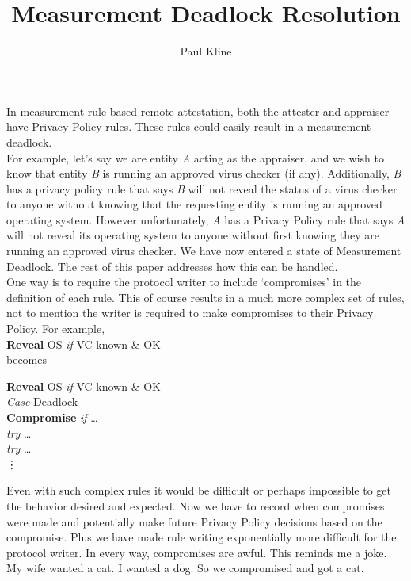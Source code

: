 \documentclass[10pt,a4paper,tikz]{article}
\author{Paul Kline}
\begin{document}
\title{Measurement Deadlock Resolution}

\maketitle

In measurement rule based remote attestation, both the attester and appraiser have Privacy Policy rules. These rules could easily result in a measurement deadlock. \\

For example, let's say we are entity \textit{A} acting as the appraiser, and we wish to know that entity \textit{B} is running an approved virus checker (if any). Additionally, \textit{B} has a privacy policy rule that says \textit{B} will not reveal the status of a virus checker to anyone without knowing that the requesting entity is running an approved operating system. However unfortunately, \textit{A} has a Privacy Policy rule that says \textit{A} will not reveal its operating system to anyone without first knowing they are running an approved virus checker. We have now entered a state of Measurement Deadlock. The rest of this paper addresses how this can be handled. \\

One way is to require the protocol writer to include `compromises' in the definition of each rule. This of course results  in a much more complex set of rules, not to mention the writer is required to make compromises to their Privacy Policy. For example, \\

\textbf{Reveal} OS \textit{if} VC known \& OK \\
becomes 

\textbf{Reveal} OS \textit{if} VC known \& OK \\
\textit{Case} Deadlock \\
\textbf{Compromise} \textit{if} \dots \\
\textit{try} \dots \\
\textit{try} \dots \\
\vdots 

Even with such complex rules it would be difficult or perhaps impossible to get the behavior desired and expected. Now we have to record when compromises were made and potentially make future Privacy Policy decisions based on the compromise. Plus we have made rule writing exponentially more difficult for the protocol writer. In every way, compromises are awful. This reminds me a joke. My wife wanted a cat. I wanted a dog. So we compromised and got a cat. 
\\
\end{document}
